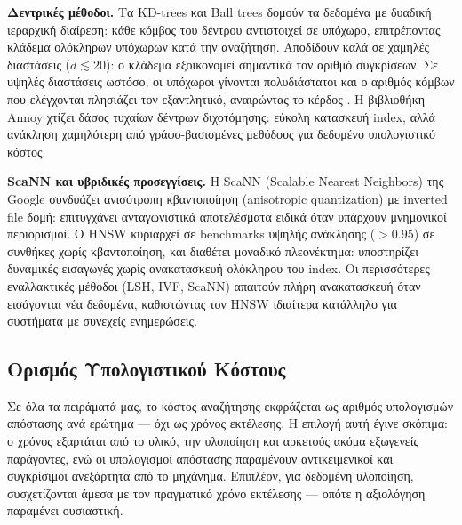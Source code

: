 \documentclass[12pt,a4paper]{article}
\begin{document}
\textbf{Δεντρικές μέθοδοι.} Τα KD-trees \cite{bentley1975kdtree} και Ball trees δομούν τα δεδομένα με δυαδική ιεραρχική διαίρεση: κάθε κόμβος του δέντρου αντιστοιχεί σε υπόχωρο, επιτρέποντας κλάδεμα ολόκληρων υπόχωρων κατά την αναζήτηση. Αποδίδουν καλά σε χαμηλές διαστάσεις ($d \lesssim 20$): ο κλάδεμα εξοικονομεί σημαντικά τον αριθμό συγκρίσεων. Σε υψηλές διαστάσεις ωστόσο, οι υπόχωροι γίνονται πολυδιάστατοι και ο αριθμός κόμβων που ελέγχονται πλησιάζει τον εξαντλητικό, αναιρώντας το κέρδος \cite{nns_survey}. Η βιβλιοθήκη Annoy \cite{bernhardsson2015annoy} χτίζει δάσος τυχαίων δέντρων διχοτόμησης: εύκολη κατασκευή index, αλλά ανάκληση χαμηλότερη από γράφο-βασισμένες μεθόδους για δεδομένο υπολογιστικό κόστος.

\textbf{ScaNN και υβριδικές προσεγγίσεις.} Η ScaNN (Scalable Nearest Neighbors) \cite{guo2020scann} της Google συνδυάζει ανισότροπη κβαντοποίηση (anisotropic quantization) με inverted file δομή: επιτυγχάνει ανταγωνιστικά αποτελέσματα ειδικά όταν υπάρχουν μνημονικοί περιορισμοί. Ο HNSW κυριαρχεί σε benchmarks υψηλής ανάκλησης ($> 0.95$) σε συνθήκες χωρίς κβαντοποίηση, και διαθέτει μοναδικό πλεονέκτημα: υποστηρίζει δυναμικές εισαγωγές χωρίς ανακατασκευή ολόκληρου του index. Οι περισσότερες εναλλακτικές μέθοδοι (LSH, IVF, ScaNN) απαιτούν πλήρη ανακατασκευή όταν εισάγονται νέα δεδομένα, καθιστώντας τον HNSW ιδιαίτερα κατάλληλο για συστήματα με συνεχείς ενημερώσεις.

\subsection{Ορισμός Υπολογιστικού Κόστους}

Σε όλα τα πειράματά μας, το κόστος αναζήτησης εκφράζεται ως αριθμός υπολογισμών απόστασης ανά ερώτημα --- όχι ως χρόνος εκτέλεσης. Η επιλογή αυτή έγινε σκόπιμα: ο χρόνος εξαρτάται από το υλικό, την υλοποίηση και αρκετούς ακόμα εξωγενείς παράγοντες, ενώ οι υπολογισμοί απόστασης παραμένουν αντικειμενικοί και συγκρίσιμοι ανεξάρτητα από το μηχάνημα. Επιπλέον, για δεδομένη υλοποίηση, συσχετίζονται άμεσα με τον πραγματικό χρόνο εκτέλεσης --- οπότε η αξιολόγηση παραμένει ουσιαστική.
\end{document}
